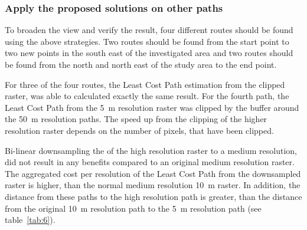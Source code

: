 
\subsubsection{Apply the proposed solutions on other paths}
To broaden the view and verify the result, four different routes should be found using the above strategies.
Two routes should be found from the start point to two new points in the south east of the investigated area and two routes should be found from the north and north east of the study area to the end point.

For three of the four routes, the Least Cost Path estimation from the clipped raster, was able to calculated exactly the same result.
For the fourth path, the Least Cost Path from the 5~m resolution raster was clipped by the buffer around the 50~m resolution paths.
The speed up from the clipping of the higher resolution raster depends on the number of pixels, that have been clipped. 

Bi-linear downsampling the of the high resolution raster to a medium resolution, did not result in any benefits compared to an original medium resolution raster.
The aggregated cost per resolution of the Least Cost Path from the downsampled raster is higher, than the normal medium resolution 10~m raster.
In addition, the distance from these paths to the high resolution path  is greater, than the distance from the original 10~m resolution path to the 5~m resolution path (see table~\ref{tab:6}).

